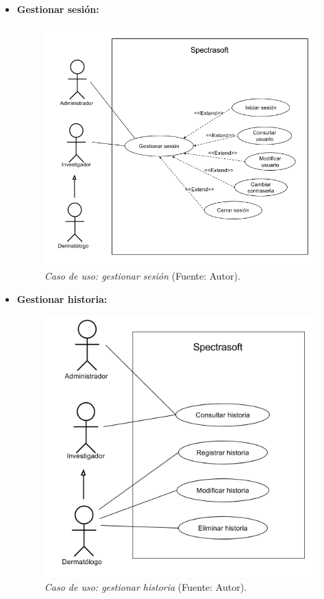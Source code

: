 \begin{itemize}
\newpage
	 	\item \textbf{Gestionar sesi\'{o}n:}
 	
 		\begin{figure}[H]
		\centering
		\includegraphics[scale=0.5]{img/cu-gestion-sesion.png}
			\caption[Caso de uso: gestionar sesi\'{o}n]{\textit{ Caso de uso: gestionar sesi\'{o}n} (Fuente: Autor).}
	\end{figure}
	
		 	\item \textbf{Gestionar historia:}
 	
 		\begin{figure}[H]
		\centering
		\includegraphics[scale=0.5]{img/cu-gestion-historia.png}
			\caption[Caso de uso: gestionar historia]{\textit{ Caso de uso: gestionar historia} (Fuente: Autor).}
	\end{figure}


\end{itemize}

